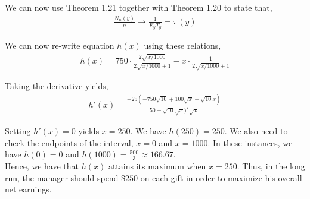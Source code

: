 \documentclass[12pt]{article}
\begin{document}
We can now use Theorem 1.21 together with Theorem 1.20 to state that,
\begin{align*}
\frac{N_n(y)}{n} \to \frac{1}{E_yT_y} = \pi(y)
\end{align*}

We can now re-write equation $h(x)$ using these relations,
\begin{align*}
h(x) = 750 \cdot \frac{2\sqrt{x/1000}}{2\sqrt{x/1000}+1} - x \cdot \frac{1}{2\sqrt{x/1000}+1}
\end{align*}

Taking the derivative yields,
\begin{align*}
h'(x) = \frac{-25(-750 \sqrt{10} + 100 \sqrt{x} + \sqrt{10}x)}{50 + \sqrt{10}\sqrt{x})^2\sqrt{x}}
\end{align*}

Setting $h'(x) = 0$ yields $x = 250$. We have $h(250) = 250$. We also need to check the endpoints of the interval, $x = 0$ and $x = 1000$. In these instances, we have $h(0) = 0$ and $h(1000) = \frac{500}{3} \approx 166.67$.\\

Hence, we have that $h(x)$ attains its maximum when $x = 250$. Thus, in the long run, the manager should spend \$$250$ on each gift in order to maximize his overall net earnings.
\end{document}
